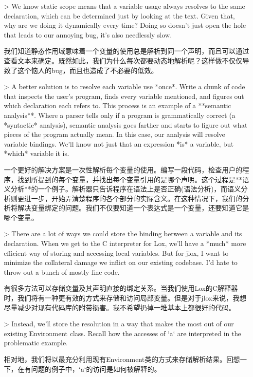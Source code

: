 \documentclass[cn,11pt,chinese]{elegantbook}
\begin{document}
{{{> We know static scope means that a variable usage always resolves to the same declaration, which can be determined just by looking at the text. Given that, why are we doing it dynamically every time? Doing so doesn’t just open the hole that leads to our annoying bug, it’s also needlessly slow.

我们知道静态作用域意味着一个变量的使用总是解析到同一个声明，而且可以通过查看文本来确定。既然如此，我们为什么每次都要动态地解析呢？这样做不仅仅导致了这个恼人的bug，而且也造成了不必要的低效。

> A better solution is to resolve each variable use *once*. Write a chunk of code that inspects the user’s program, finds every variable mentioned, and figures out which declaration each refers to. This process is an example of a **semantic analysis**. Where a parser tells only if a program is grammatically correct (a *syntactic* analysis), semantic analysis goes farther and starts to figure out what pieces of the program actually mean. In this case, our analysis will resolve variable bindings. We’ll know not just that an expression *is* a variable, but *which* variable it is.

一个更好的解决方案是一次性解析每个变量的使用。编写一段代码，检查用户的程序，找到所提到的每个变量，并找出每个变量引用的是哪个声明。这个过程是**语义分析**的一个例子。解析器只告诉程序在语法上是否正确(语法分析)，而语义分析则更进一步，开始弄清楚程序的各个部分的实际含义。在这种情况下，我们的分析将解决变量绑定的问题。我们不仅要知道一个表达式是一个变量，还要知道它是哪个变量。

> There are a lot of ways we could store the binding between a variable and its declaration. When we get to the C interpreter for Lox, we’ll have a *much* more efficient way of storing and accessing local variables. But for jlox, I want to minimize the collateral damage we inflict on our existing codebase. I’d hate to throw out a bunch of mostly fine code.

有很多方法可以存储变量及其声明直接的绑定关系。当我们使用Lox的C解释器时，我们将有一种更有效的方式来存储和访问局部变量。但是对于jlox来说，我想尽量减少对现有代码库的附带损害。我不希望扔掉一堆基本上都很好的代码。

> Instead, we’ll store the resolution in a way that makes the most out of our existing Environment class. Recall how the accesses of `a` are interpreted in the problematic example.

相对地，我们将以最充分利用现有Environment类的方式来存储解析结果。回想一下，在有问题的例子中，`a`的访问是如何被解释的。

}}}
\end{document}
